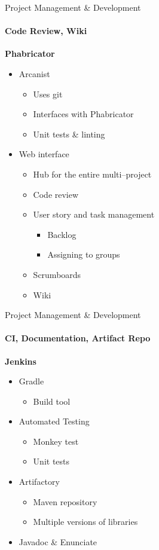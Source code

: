 \begin{frame}{Project Management \& Development}\framesubtitle{Code Review, Wiki}
    \textbf{Phabricator}
    \begin{itemize}
        \item Arcanist
        \begin{itemize}
            \item Uses git
            \item Interfaces with Phabricator
            \item Unit tests \& linting
        \end{itemize}
        \item Web interface
        \begin{itemize}
            \item Hub for the entire multi--project
            \item Code review
            \item User story and task management
            \begin{itemize}
                \item Backlog
                \item Assigning to groups
            \end{itemize}
            \item Scrumboards
            \item Wiki
        \end{itemize}
    \end{itemize}
\end{frame}
\begin{frame}{Project Management \& Development}\framesubtitle{CI, Documentation, Artifact Repo}
    \textbf{Jenkins}
    \begin{itemize}
        \item Gradle
        \begin{itemize}
            \item Build tool
        \end{itemize}
        \item Automated Testing
        \begin{itemize}
            \item Monkey test
            \item Unit tests
        \end{itemize}
        \item Artifactory
        \begin{itemize}
            \item Maven repository
            \item Multiple versions of libraries
        \end{itemize}
        \item Javadoc \& Enunciate
    \end{itemize}
\end{frame}

